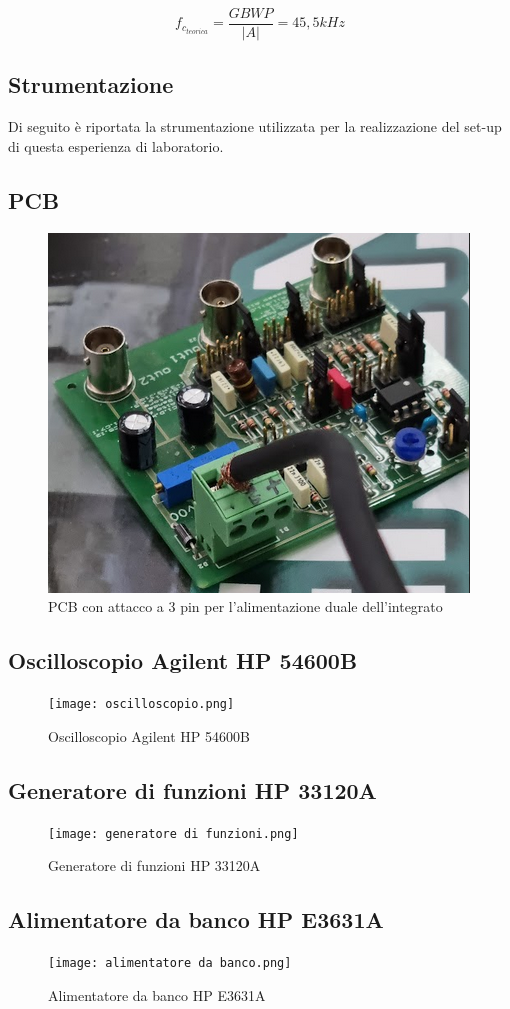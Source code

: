 \[f_{c_{teorica}}=\frac{GBWP}{|A|}=45,5kHz\]
\subsection{Strumentazione}
Di seguito è riportata la strumentazione utilizzata per la realizzazione del set-up di questa esperienza di laboratorio.

\subsection*{\textbf{PCB}}
\begin{figure}[h]
    \centering
    \includegraphics[width=0.5\linewidth]{media/PCB_attacco3pin.png}
    \caption{PCB con attacco a 3 pin per l'alimentazione duale dell'integrato}
    \label{fig:PCB_3pin}
\end{figure}
\FloatBarrier
\subsection*{\textbf{Oscilloscopio Agilent HP 54600B}}
\begin{figure}[h]
    \centering
    \texttt{[image: oscilloscopio.png]}
    \caption{Oscilloscopio Agilent HP 54600B}
    \label{fig:Agilent HP 54600B}
\end{figure}
\FloatBarrier
\subsection*{\textbf{Generatore di funzioni HP 33120A}}
\begin{figure}[h]
    \centering
    \texttt{[image: generatore di funzioni.png]}
    \caption{Generatore di funzioni HP 33120A}
    \label{fig:enter-label}
\end{figure}
\FloatBarrier
\subsection*{\textbf{Alimentatore da banco HP E3631A}}
\begin{figure}[h]
    \centering
    \texttt{[image: alimentatore da banco.png]}
    \caption{Alimentatore da banco HP E3631A}
    \label{fig:HPE3631A}
\end{figure}
\FloatBarrier

